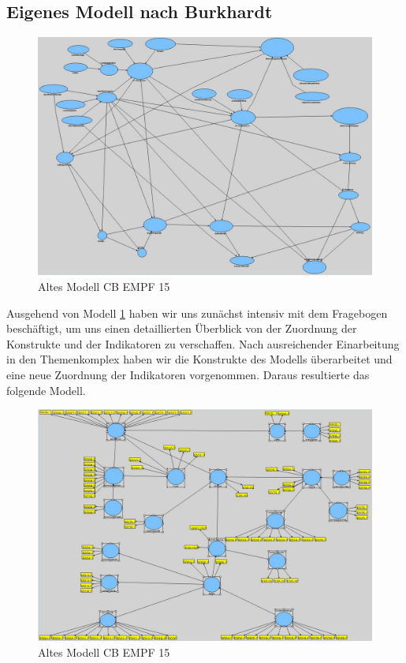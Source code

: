 \documentclass{article}\usepackage[]{graphicx}\usepackage[]{color}
\begin{document}
\subsection{Eigenes Modell nach Burkhardt}



\begin{figure}[h!]
\centering
\hspace*{-4.8cm}\includegraphics[scale = 0.8]{figure/ausgangsmodell}
\caption{Altes Modell CB EMPF 15}
\label{ausgangsmodell}
\end{figure}

\newpage
Ausgehend von Modell \ref{ausgangsmodell} haben wir uns zunächst intensiv mit dem Fragebogen beschäftigt, um uns einen detaillierten Überblick von der Zuordnung der Konstrukte und der Indikatoren zu verschaffen. Nach ausreichender Einarbeitung in den Themenkomplex haben wir die Konstrukte des Modells überarbeitet und eine neue Zuordnung der Indikatoren vorgenommen. Daraus resultierte das folgende Modell.\\


\begin{figure}[h!]
\centering
\hspace*{-4.8cm}\includegraphics[scale = 0.8]{figure/erstesmodell}
\caption{Altes Modell CB EMPF 15}
\label{erstesmodell}
\end{figure}
\end{document}
